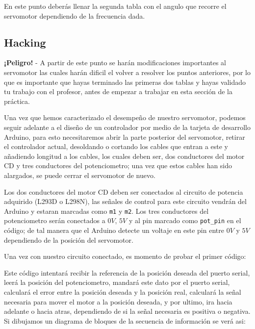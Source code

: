 		En este punto deberás llenar la segunda tabla con el angulo que recorre el servomotor dependiendo de la frecuencia dada.

		\subsection{Hacking}

		\textbf{¡Peligro!} - A partir de este punto se harán modificaciones importantes al servomotor las cuales harán dificil el volver a resolver los puntos anteriores, por lo que es importante que hayas terminado las primeras dos tablas y hayas validado tu trabajo con el profesor, antes de empezar a trabajar en esta sección de la práctica.

		Una vez que hemos caracterizado el desempeño de nuestro servomotor, podemos seguir adelante a el diseño de un controlador por medio de la tarjeta de desarrollo Arduino, para esto necesitaremos abrir la parte posterior del servomotor, retirar el controlador actual, desoldando o cortando los cables que entran a este y añadiendo longitud a los cables, los cuales deben ser, dos conductores del motor CD y tres conductores del potenciometro; una vez que estos cables han sido alargados, se puede cerrar el servomotor de nuevo.

		Los dos conductores del motor CD deben ser conectados al circuito de potencia adquirido (L293D o L298N), las señales de control para este circuito vendrán del Arduino y estaran marcadas como \texttt{m1} y \texttt{m2}. Los tres conductores del potenciometro serán conectados a $0V$, $5V$ y al pin marcado como \texttt{pot\_pin} en el código; de tal manera que el Arduino detecte un voltaje en este pin entre $0V$ y $5V$ dependiendo de la posición del servomotor.

		Una vez con nuestro circuito conectado, es momento de probar el primer código:

		\begin{fullwidth}
			\begin{multicols}{2}
				
			\end{multicols}
		\end{fullwidth}

		Este código intentará recibir la referencia de la posición deseada del puerto serial, leerá la posición del potenciometro, mandará este dato por el puerto serial, calculará el error entre la posición deseada y la posición real, calculará la señal necesaria para mover el motor a la posición deseada, y por ultimo, ira hacia adelante o hacia atras, dependiendo de si la señal necesaria es positiva o negativa. Si dibujamos un diagrama de bloques de la secuencia de información se verá asi:

